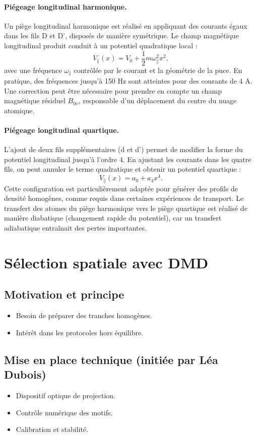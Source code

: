 \paragraph{Piégeage longitudinal harmonique.}
Un piège longitudinal harmonique est réalisé en appliquant des courants égaux dans les fils D et D', disposés de manière symétrique. Le champ magnétique longitudinal produit conduit à un potentiel quadratique local :
\[
V_\parallel(x) = V_0 + \frac{1}{2} m \omega_\parallel^2 x^2,
\]
avec une fréquence $\omega_\parallel$ contrôlée par le courant et la géométrie de la puce. En pratique, des fréquences jusqu’à 150 Hz sont atteintes pour des courants de 4 A. Une correction peut être nécessaire pour prendre en compte un champ magnétique résiduel $B_{0v}$, responsable d’un déplacement du centre du nuage atomique.

\paragraph{Piégeage longitudinal quartique.}
L’ajout de deux fils supplémentaires (d et d') permet de modifier la forme du potentiel longitudinal jusqu’à l’ordre 4. En ajustant les courants dans les quatre fils, on peut annuler le terme quadratique et obtenir un potentiel quartique :
\[
V_\parallel(x) = a_0 + a_4 x^4.
\]
Cette configuration est particulièrement adaptée pour générer des profils de densité homogènes, comme requis dans certaines expériences de transport. Le transfert des atomes du piège harmonique vers le piège quartique est réalisé de manière diabatique (changement rapide du potentiel), car un transfert adiabatique entraînait des pertes importantes.



\section{Sélection spatiale avec DMD}
\subsection{Motivation et principe}
\begin{itemize}
    \item Besoin de préparer des tranches homogènes.
    \item Intérêt dans les protocoles hors équilibre.
\end{itemize}

\subsection{Mise en place technique (initiée par Léa Dubois)}
\begin{itemize}
    \item Dispositif optique de projection.
    \item Contrôle numérique des motifs.
    \item Calibration et stabilité.
\end{itemize}

